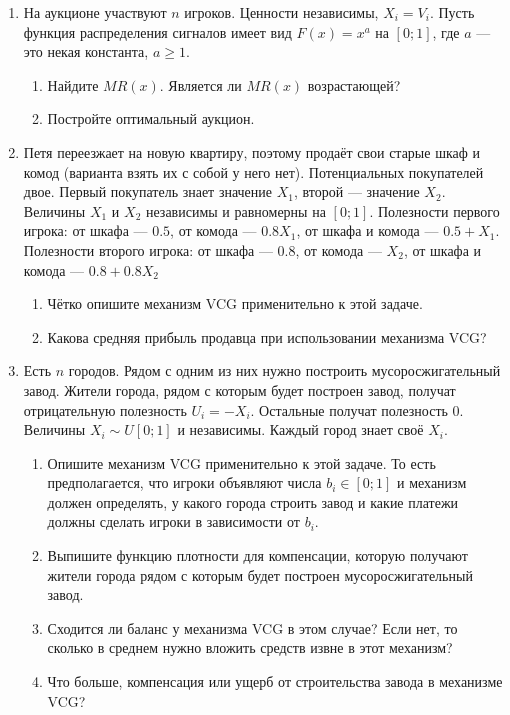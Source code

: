 \begin{enumerate}

\item На аукционе участвуют $ n $ игроков. Ценности независимы, $ X_{i}=V_{i}$. Пусть функция распределения сигналов имеет вид $ F(x)=x^{a} $ на $ [0;1] $, где $ a $ — это некая константа, $ a\geq 1 $.
\begin{enumerate}
\item Найдите $ MR(x) $. Является ли $ MR(x) $ возрастающей?
\item Постройте оптимальный аукцион.
\end{enumerate}

\item Петя переезжает на новую квартиру, поэтому продаёт свои старые шкаф и комод (варианта взять их с собой у него нет).  Потенциальных покупателей двое. Первый покупатель знает значение $ X_{1} $, второй — значение $ X_{2} $. Величины  $ X_{1} $ и  $ X_{2} $ независимы и равномерны на $ [0;1] $. Полезности первого игрока: от шкафа — $ 0.5 $, от комода — $ 0.8X_{1} $, от шкафа и комода — $ 0.5+X_{1} $. Полезности второго игрока: от шкафа — $ 0.8 $, от комода — $ X_{2} $, от шкафа и комода — $ 0.8+0.8X_{2}$
\begin{enumerate}
\item Чётко опишите механизм VCG применительно к этой задаче.
\item Какова средняя прибыль продавца при использовании механизма VCG?
\end{enumerate}

\item Есть $ n $ городов. Рядом с одним из них нужно построить мусоросжигательный завод. Жители города, рядом с которым будет построен завод, получат отрицательную полезность $ U_{i}=-X_{i} $. Остальные получат полезность 0. Величины $ X_{i}\sim U[0;1] $ и независимы. Каждый город знает своё $ X_{i} $.
\begin{enumerate}
\item Опишите механизм VCG применительно к этой задаче. То есть предполагается, что игроки объявляют числа $ b_{i}\in [0;1] $ и механизм должен определять, у какого города строить завод и какие платежи должны сделать игроки в зависимости от $ b_{i} $.
\item Выпишите функцию плотности для компенсации, которую получают жители города рядом с которым будет построен мусоросжигательный завод.
\item Сходится ли баланс у механизма VCG в этом случае? Если нет, то сколько в среднем нужно вложить средств извне в этот механизм?
\item Что больше, компенсация или ущерб от строительства завода в механизме VCG?
\end{enumerate}



\end{enumerate}

